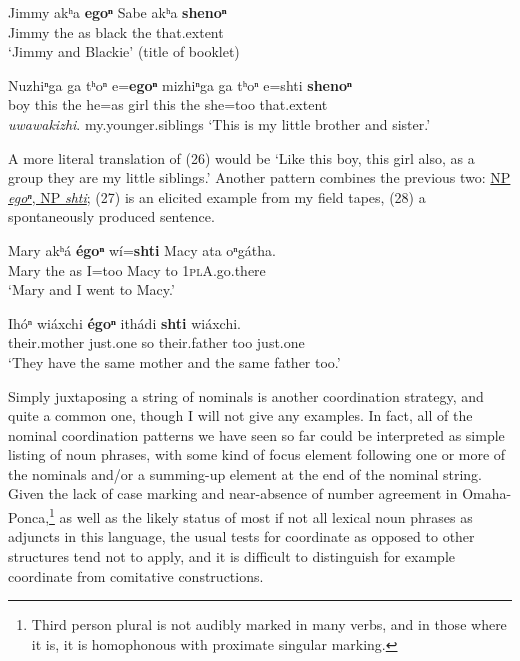\documentclass[output=paper]{LSP/langsci}
\begin{document}
\begin{exe}	
\ex
\gll Jimmy 	akʰa \textbf{egoⁿ} Sabe akʰa \textbf{shenoⁿ} \\
Jimmy the  	as 	black 	the  	that.extent \\
\trans `Jimmy and Blackie' (title of booklet)

\ex 
\gll Nuzhiⁿga ga tʰoⁿ e=\textbf{egoⁿ} mizhiⁿga ga  tʰoⁿ e=shti 	\textbf{shenoⁿ}  \\
boy 	this 	the 	he=as   	girl   this the she=too  that.extent 	 \\

\textit{uwawakizhi}.
my.younger.siblings
\trans `This is my little brother and sister.' 	
\end{exe}	 
	
A more literal translation of (26) would be `Like this boy, this girl also, as a group they are my little siblings.' Another pattern combines the previous two:   \underline{NP \textit{egoⁿ}, NP \textit{shti}}; (27) is an elicited example from my field tapes, (28) a spontaneously produced sentence. 

\begin{exe}	
\ex
\gll Mary akʰ\'a \textbf{\'egoⁿ}  w\'i=\textbf{shti} Macy 	ata 	oⁿg\'atha. \\
Mary the as I=too Macy to 	\textsc{1plA}.go.there \\
\trans`Mary and  I went to Macy.'

\ex
\gll Ih\'oⁿ  wi\'axchi  \textbf{\'egoⁿ} ith\'adi  \textbf{shti} wi\'axchi. \\
their.mother  just.one so their.father too just.one \\
\trans `They have the same mother and the same father too.'
\end{exe}	

Simply juxtaposing a string of nominals is another coordination strategy, and quite a common one, though I will not give any examples. In fact, all of the nominal coordination patterns we have seen so far could be interpreted as simple listing of noun phrases, with some kind of focus element following one or more of the nominals and/or a summing-up element at the end of the nominal string. Given the lack of case marking and near-absence of number agreement  in Omaha-Ponca,\footnote{Third person plural is not audibly marked in many verbs, and in those where it is, it is homophonous with
proximate singular marking.} as well as the likely status of most if not all lexical noun phrases as adjuncts in this language, the usual tests for coordinate as opposed to other structures tend not to apply, and it is difficult to distinguish for example coordinate from comitative constructions.
\end{document}
